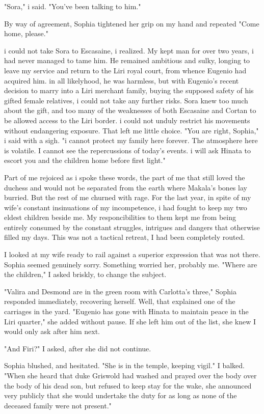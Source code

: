 \documentclass{article}
\begin{document}
"Sora," i said. "You've been talking to him."

By way of agreement, Sophia tightened her grip on my hand and repeated "Come home, please."

i could not take Sora to Escasaine, i realized. My kept man for over two years, i had never managed to tame him. He remained ambitious and sulky, longing to leave my service and return to the Liri royal court, from whence Eugenio had acquired him. in all likelyhood, he was harmless, but with Eugenio's recent decision to marry into a Liri merchant family, buying the supposed safety of his gifted female relatives, i could not take any further risks. Sora knew too much about the gift, and too many of the weaknesses of both Escasaine and Cortan to be allowed access to the Liri border. i could not unduly restrict his movements without endangering exposure. That left me little choice. "You are right, Sophia," i said with a sigh. "i cannot protect my family here forever. The atmosphere here is volatile. I cannot see the repercussions of today's events. i will ask Hinata to escort you and the children home before first light."

Part of me rejoiced as i spoke these words, the part of me that still loved the duchess and would not be separated from the earth where Makala's bones lay burried. But the rest of me churned with rage. For the last year, in spite of my wife's constant insinuations of my incompetence, i had fought to keep my two eldest children beside me. My responcibilities to them kept me from being entirely consumed by the constant struggles, intrigues and dangers that otherwise filled my days. This was not a tactical retreat, I had been completely routed.

I looked at my wife ready to rail against a superior expression that was not there. Sophia seemed genuinely sorry. Something worried her, probably me. "Where are the children," I asked briskly, to change the subject.

"Valira and Desmond are in the green room with Carlotta's three," Sophia responded immediately, recovering herself. Well, that explained one of the carriages in the yard. "Eugenio has gone with Hinata to maintain peace in the Liri quarter," she added without pause. If she left him out of the list, she knew I would only ask after him next.

"And Firi?" I asked, after she did not continue.

Sophia blushed, and hesitated. "She is in the temple, keeping vigil." I balked. "When she heard that duke Griswold had washed and prayed over the body over the body of his dead son, but refused to keep stay for the wake, she announced very publicly that she would undertake the duty for as long as none of the deceased family were not present."
\end{document}
